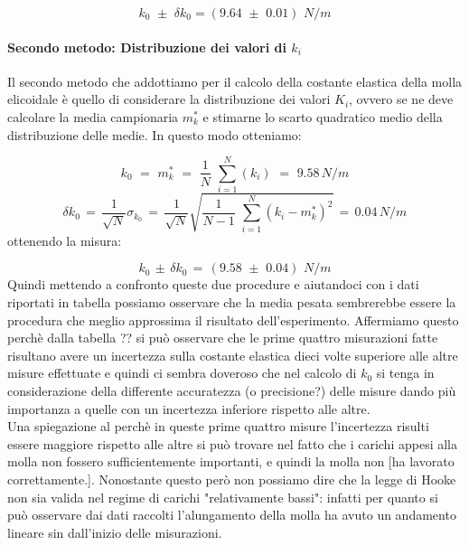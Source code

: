 \begin{equation}
	k_0 \,\, \pm \,\, \delta k_0 =  (9.64 \,\, \pm \,\, 0.01) \,\,N/m
\end{equation}

\paragraph{Secondo metodo: Distribuzione dei valori di $k_i$\\}
Il secondo metodo che addottiamo per il calcolo della costante elastica della molla elicoidale è quello di considerare la distribuzione dei valori $K_i$, ovvero se ne deve calcolare la media campionaria $m^*_k$ e stimarne lo scarto quadratico medio della distribuzione delle medie. In questo modo otteniamo:

\begin{equation*}
	k_0 \,\,=\,\, m^*_k \,\,=\,\, \frac{1}{N}\,\,\sum_{i=1}^{N} (k_i) \,\,=\,\, 9.58  \,N/m
\end{equation*}
%
\begin{equation*}
	\delta k_0  \,=\, \frac{1}{\sqrt{N}} \sigma_{k_0} \,=\, \frac{1}{\sqrt{N}}\sqrt{\frac{1}{N - 1}\,\,\sum_{i=1}^{N} (k_i - m^*_k)^2}\,=\, 0.04 \,N/m
\end{equation*}
%
ottenendo la misura:

\begin{equation}
		k_0 \, \pm \, \delta k_0 \,=\, (9.58 \,\, \pm \,\, 0.04)\,\, N/m
\end{equation}
%
Quindi mettendo a confronto queste due procedure e aiutandoci con i dati riportati in tabella possiamo osservare che la media pesata sembrerebbe essere la procedura che meglio approssima il risultato dell'esperimento. Affermiamo questo perchè dalla tabella ?? si può osservare che le prime quattro misurazioni fatte risultano avere un incertezza sulla costante elastica dieci volte superiore alle altre misure effettuate e quindi ci sembra doveroso che nel calcolo di $k_0$ si tenga in considerazione della differente accuratezza (o precisione?) delle misure dando più importanza a quelle con un incertezza inferiore rispetto alle altre.\\
Una spiegazione al perchè in queste prime quattro misure l'incertezza risulti essere maggiore rispetto alle altre si può trovare nel fatto che i carichi appesi alla molla non fossero sufficientemente importanti, e quindi la molla non [ha lavorato correttamente.]. Nonostante questo però non possiamo dire che la legge di Hooke non sia valida nel regime di carichi "relativamente bassi": infatti per quanto si può osservare dai dati raccolti l'alungamento della molla ha avuto un andamento lineare sin dall'inizio delle misurazioni.


